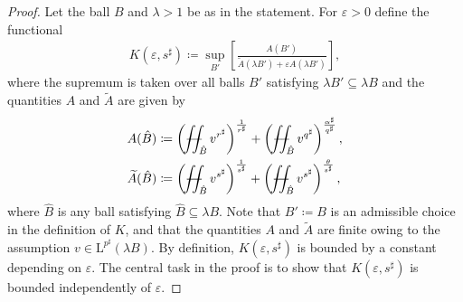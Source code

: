 \documentclass[10pt,a4paper]{amsart}
\renewcommand{\L}{\mathrm{L}}
\def\YYint#1#2#3{{\setbox0=\hbox{$#1{#2#3}{\iint}$}
		\vcenter{\hbox{$#2#3$}}\kern-.51\wd0}}
\def\Yint#1{\mathchoice
	{\YYint\displaystyle\textstyle{#1}}%
	{\YYint\textstyle\scriptstyle{#1}}%
	{\YYint\scriptstyle\scriptscriptstyle{#1}}%
	{\YYint\scriptscriptstyle\scriptscriptstyle{#1}}%
	\!\iint}
\newcommand{\eps}{\varepsilon}
\def\longdash{{-}\mkern-3.5mu{-}}
\def\tiltfiint{\Yint\longdash}
\newcommand{\wt}{\widetilde}
\begin{document}
	\begin{proof}
		Let the ball $B$ and $\lambda > 1$ be as in the statement.
		For $\eps > 0$ define the functional
		\begin{align}
			K(\eps, s^\sharp) \coloneqq \sup_{B'} \left[ \frac{A(B')}{\wt A(\lambda B') + \eps A(\lambda B')}\right],
		\end{align}
		where the supremum is taken over all balls $B'$ satisfying $\lambda B' \subseteq \lambda B$
		and the quantities $A$ and $\tilde A$ are given by
		\begin{align}
			A(\hat B) &\coloneqq \left( \tiltfiint_{\hat B} v^{r^\sharp} \right)^\frac{1}{r^\sharp} + \left( \tiltfiint_{\hat B} v^{q^\sharp} \right)^\frac{\alpha^\sharp}{q^\sharp}, \\
			\wt A(\hat B) &\coloneqq \left( \tiltfiint_{\hat B} v^{s^\sharp} \right)^\frac{1}{s^\sharp} + \left( \tiltfiint_{\hat B} v^{s^\sharp} \right)^\frac{\theta}{s^\sharp},
		\end{align}
		{where $\hat B$ is any ball satisfying $\hat B \subseteq \lambda B$. Note that $B' \coloneqq B$ is an admissible choice in the definition of $K$, and that the quantities $A$ and $\tilde A$ are finite owing to the assumption $v\in \L^{p^\sharp}(\lambda B)$.}
		By definition, $K(\eps, s^\sharp)$ is bounded by a constant depending on $\eps$. The central task in the proof is to show that $K(\eps, s^\sharp)$ is bounded independently of $\eps$.


\end{proof}
\end{document}
